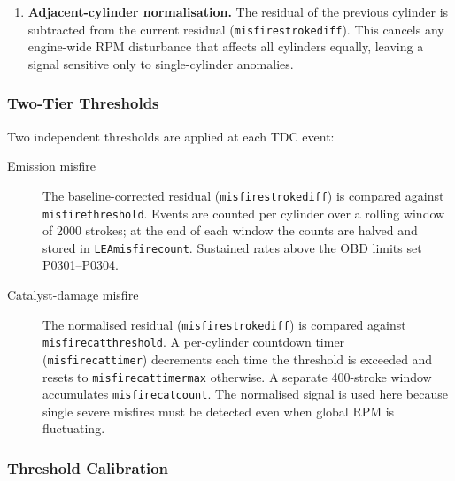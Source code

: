 \documentclass[a4paper,11pt]{article}
\renewcommand{\_}{\oldunderscore\allowbreak}
\begin{document}
\begin{enumerate}
        The table is then trimmed per engine during DFSO, and only while the
        speed-transient flag is clear. Cutting fuel removes combustion torque,
        by far the largest cylinder-to-cylinder variable, leaving the fixed
        mechanical and measurement signature to be measured against an engine
        that is being turned smoothly by the driveline. Adaptation is a slow
        $\pm$1 dither on a value stored at 16$\times$ resolution.

  \item \textbf{Adjacent-cylinder normalisation.} The residual of the previous
        cylinder is subtracted from the current residual
        (\texttt{misfire\_stroke\_diff\_2}). This cancels any engine-wide RPM
        disturbance that affects all cylinders equally, leaving a signal
        sensitive only to single-cylinder anomalies.
\end{enumerate}

\subsubsection*{Two-Tier Thresholds}

Two independent thresholds are applied at each TDC event:

\begin{description}
  \item[Emission misfire] The baseline-corrected residual
        (\texttt{misfire\_stroke\_diff\_1}) is compared against
        \texttt{misfire\_threshold}. Events are counted per cylinder over a
        rolling window of 2000 strokes; at the end of each window the counts
        are halved and stored in \texttt{LEA\_misfire\_count}. Sustained rates
        above the OBD limits set P0301--P0304.

  \item[Catalyst-damage misfire] The normalised residual
        (\texttt{misfire\_stroke\_diff\_2}) is compared against
        \texttt{misfire\_cat\_threshold}. A per-cylinder countdown timer
        (\texttt{misfire\_cat\_timer}) decrements each time the threshold is
        exceeded and resets to \texttt{misfire\_cat\_timer\_max} otherwise. A
        separate 400-stroke window accumulates \texttt{misfire\_cat\_count}.
        The normalised signal is used here because single severe misfires must
        be detected even when global RPM is fluctuating.
\end{description}

\subsubsection*{Threshold Calibration}
\end{document}
